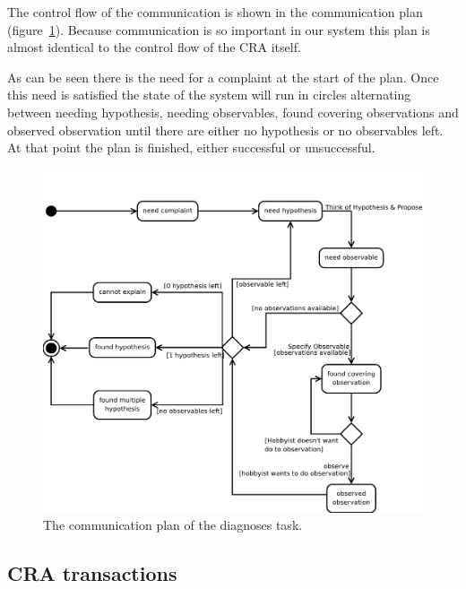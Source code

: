 The control flow of the communication is shown in the communication plan (figure~\ref{fig:communicationPlan}). Because communication is so important in our system this plan is almost identical to the control flow of the CRA itself. 

As can be seen there is the need for a complaint at the start of the plan. Once this need is satisfied the state of the system will run in circles alternating between needing hypothesis, needing observables, found covering observations and observed observation until there are either no hypothesis or no observables left. At that point the plan is finished, either successful or unsuccessful.

\begin{figure}[htbp]
    \centering
    \includegraphics[width=1.00\textwidth]{communicationPlan.pdf}
    \caption{The communication plan of the diagnoses task.}
    \label{fig:communicationPlan}
\end{figure}

\subsection{CRA transactions}


